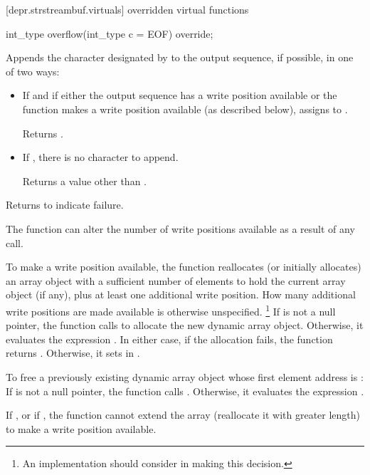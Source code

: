[depr.strstreambuf.virtuals]{ overridden virtual functions}

%
\begin{itemdecl}
int_type overflow(int_type c = EOF) override;
\end{itemdecl}

\begin{itemdescr}
\pnum
\effects
Appends the character designated by  to the output
sequence, if possible, in one of two ways:
\begin{itemize}
\item
If
and if either the output sequence has a write position available or
the function makes a write position available
(as described below),
assigns  to
.

Returns
.

\item
If
,
there is no character to append.

Returns a value other than .
\end{itemize}

\pnum
Returns
to indicate failure.

\pnum
\remarks
The function can alter the number of write positions available as a
result of any call.

\pnum
To make a write position available, the function reallocates
(or initially allocates)
an array object with a sufficient number of elements
 to hold the current array object (if any),
plus at least one additional write position.
How many additional write positions are made
available is otherwise unspecified.%
%
\footnote{An implementation should consider  in making this
decision.}
If  is not a null pointer, the function calls
to allocate the new dynamic array object.
Otherwise, it evaluates the expression
.
In either case, if the allocation fails, the function returns
.
Otherwise, it sets  in .

\pnum
To free a previously existing dynamic array object whose first
element address is :
If  is not a null pointer,
the function calls
.
Otherwise, it evaluates the expression .

\pnum
If
,
or if
,
the function cannot extend the array (reallocate it with greater length) to make a write position available.
\end{itemdescr}

